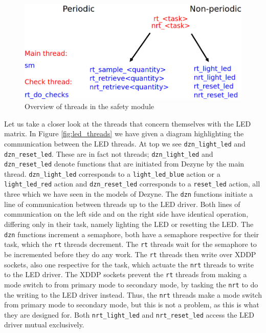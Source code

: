 \documentclass[12pt]{scrreprt}
\begin{document}
\begin{figure}[H]
    \centering
    \includegraphics[width=\textwidth]{Figures/results/modelling_figures/Threading/threads_overview.png}
    \caption{Overview of threads in the safety module}
    \label{fig:threads_overview}
\end{figure}

Let us take a closer look at the threads that concern themselves with the LED matrix. In Figure \ref{fig:led_threads} we have given a diagram highlighting the communication between the LED threads. At top we see \texttt{dzn\_light\_led} and \texttt{dzn\_reset\_led}. These are in fact not threads; \texttt{dzn\_light\_led} and \texttt{dzn\_reset\_led} denote functions that are initiated from Dezyne by the main thread. \texttt{dzn\_light\_led} corresponds to a \texttt{light\_led\_blue} action or a \texttt{light\_led\_red} action and \texttt{dzn\_reset\_led} corresponds to a \texttt{reset\_led} action, all three which we have seen in the models of Dezyne. The \texttt{dzn} functions initiate a line of communication between threads up to the LED driver. Both lines of communication on the left side and on the right side have identical operation, differing only in their task, namely lighting the LED or resetting the LED. The \texttt{dzn} functions increment a semaphore, both have a semaphore respective for their task, which the \texttt{rt} threads decrement. The \texttt{rt} threads wait for the semaphore to be incremented before they do any work. The \texttt{rt} threads then write over XDDP sockets, also one respective for the task, which actuate the \texttt{nrt} threads to write to the LED driver. The XDDP sockets prevent the \texttt{rt} threads from making a mode switch to from primary mode to secondary mode, by tasking the \texttt{nrt} to do the writing to the LED driver instead. Thus, the \texttt{nrt} threads make a mode switch from primary mode to secondary mode, but this is not a problem, as this is what they are designed for. Both \texttt{nrt\_light\_led} and \texttt{nrt\_reset\_led} access the LED driver mutual exclusively.
\end{document}
